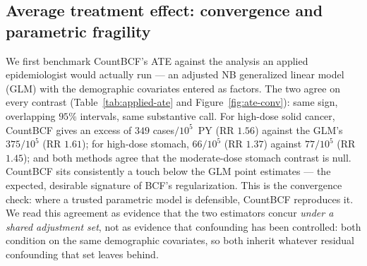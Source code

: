 \documentclass[11pt]{article}
\begin{document}
\subsection{Average treatment effect: convergence and parametric fragility}
\label{sec:applied-ate}

We first benchmark CountBCF's ATE against the analysis an applied
epidemiologist would actually run --- an adjusted NB generalized linear
model (GLM) with the demographic covariates entered as factors. The two
agree on every contrast (Table~\ref{tab:applied-ate} and
Figure~\ref{fig:ate-conv}): same sign, overlapping $95\%$ intervals, same
substantive call. For high-dose solid
cancer, CountBCF gives an excess of $349$ cases$/10^5$~PY (RR $1.56$) against
the GLM's $375/10^5$ (RR $1.61$); for high-dose stomach, $66/10^5$ (RR
$1.37$) against $77/10^5$ (RR $1.45$); and both methods agree that the
moderate-dose stomach contrast is null. CountBCF sits consistently a touch
below the GLM point estimates --- the expected, desirable signature of BCF's
regularization. This is the convergence check: where a trusted parametric
model is defensible, CountBCF reproduces it. We read this agreement as
evidence that the two estimators concur \emph{under a shared adjustment set},
not as evidence that confounding has been controlled: both condition on the
same demographic covariates, so both inherit whatever residual confounding
that set leaves behind.
\end{document}
